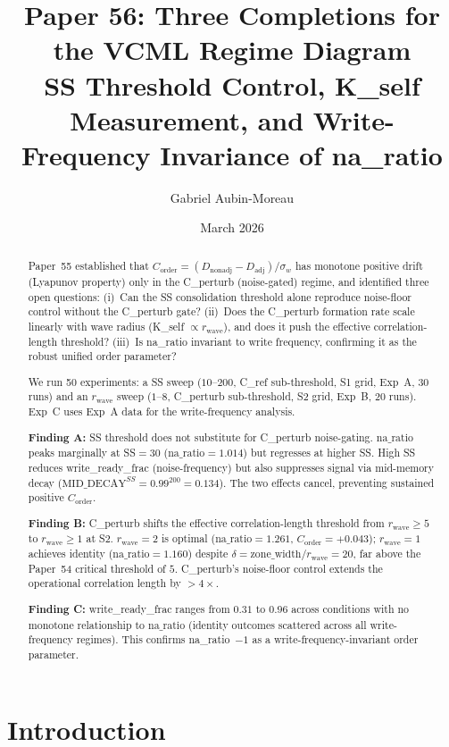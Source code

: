 \documentclass[11pt,a4paper]{article}
\title{\textbf{Paper 56: Three Completions for the VCML Regime Diagram}\\
\large SS Threshold Control, K\_self Measurement, and
Write-Frequency Invariance of na\_ratio}
\author[1]{Gabriel Aubin-Moreau}
\affil[1]{Independent research}
\date{March 2026}
\newcommand{\Corder}{C_{\mathrm{order}}}
\newcommand{\Dadj}{D_{\mathrm{adj}}}
\newcommand{\Dnadj}{D_{\mathrm{nonadj}}}
\newcommand{\sw}{\sigma_w}
\newcommand{\na}{\mathrm{na\_ratio}}
\begin{document}
\maketitle

\begin{abstract}
Paper~55 established that $\Corder = (\Dnadj - \Dadj)/\sw$ has monotone positive
drift (Lyapunov property) only in the C\_perturb (noise-gated) regime, and identified
three open questions: (i)~Can the SS consolidation threshold alone reproduce noise-floor
control without the C\_perturb gate? (ii)~Does the C\_perturb formation rate scale
linearly with wave radius (K\_self $\propto r_\mathrm{wave}$), and does it push the
effective correlation-length threshold? (iii)~Is na\_ratio invariant to write frequency,
confirming it as the robust unified order parameter?

We run 50 experiments: a SS sweep ($10$--$200$, C\_ref sub-threshold, S1 grid,
Exp~A, 30 runs) and an $r_\mathrm{wave}$ sweep ($1$--$8$, C\_perturb sub-threshold,
S2 grid, Exp~B, 20 runs). Exp~C uses Exp~A data for the write-frequency analysis.

\textbf{Finding A:} SS threshold does not substitute for C\_perturb noise-gating.
$\na$ peaks marginally at SS$=30$ ($\na=1.014$) but regresses at higher SS.
High SS reduces write\_ready\_frac (noise-frequency) but also suppresses signal
via mid-memory decay ($\mathrm{MID\_DECAY}^{SS} = 0.99^{200} = 0.134$).
The two effects cancel, preventing sustained positive $\Corder$.

\textbf{Finding B:} C\_perturb shifts the effective correlation-length threshold
from $r_\mathrm{wave} \geq 5$ to $r_\mathrm{wave} \geq 1$ at S2.
$r_\mathrm{wave}=2$ is optimal ($\na=1.261$, $\Corder=+0.043$);
$r_\mathrm{wave}=1$ achieves identity ($\na=1.160$) despite
$\delta=\text{zone\_width}/r_\mathrm{wave}=20$, far above the Paper~54 critical
threshold of $5$. C\_perturb's noise-floor control extends the operational
correlation length by $>4\times$.

\textbf{Finding C:} write\_ready\_frac ranges from $0.31$ to $0.96$ across
conditions with no monotone relationship to $\na$ (identity outcomes scattered
across all write-frequency regimes). This confirms na\_ratio~$-1$ as a
write-frequency-invariant order parameter.

\end{abstract}

\section{Introduction}
\end{document}
